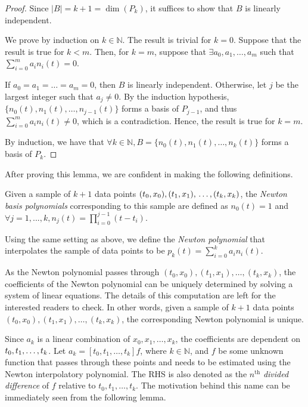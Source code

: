 \documentclass[a4paper,11pt,titlepage]{article}
\theoremstyle{definition}
\theoremstyle{plain}
\theoremstyle{remark}
\begin{document}
\begin{proof}
    Since $|B|=k+1=\dim(P_k)$, it suffices to show that $B$ is linearly independent.
    
    We prove by induction on $k\in\mathbb{N}$. The result is trivial for $k=0$. Suppose that the result is true for $k<m$. Then, for $k=m$, suppose that $\exists a_0,a_1,\dots,a_m$ such that $\sum_{i=0}^ma_in_i(t)=0$.

    If $a_0=a_1=\dots=a_m=0$, then $B$ is linearly independent. Otherwise, let $j$ be the largest integer such that $a_j\neq0$. By the induction hypothesis, $\{n_0(t),n_1(t),\dots,n_{j-1}(t)\}$ forms a basis of $P_{j-1}$, and thus $\sum_{i=0}^ma_in_i(t)\neq0$, which is a contradiction. Hence, the result is true for $k=m$.

    By induction, we have that $\forall k\in\mathbb{N}, B=\{n_0(t),n_1(t),\dots,n_k(t)\}$ forms a basis of $P_k$.
\end{proof}

After proving this lemma, we are confident in making the following definitions.

Given a sample of $k+1$ data points
$(t_0,x_0), (t_1,x_1), \\\dots, (t_k,x_k)$, the \textit{Newton basis polynomials} corresponding to this sample are defined as $n_0(t)=1$ and $\forall j=1,...,k, n_j(t)=\prod_{i=0}^{j-1}(t-t_i)$.

Using the same setting as above, we define the \textit{Newton polynomial} that interpolates the sample of data points to be $p_k(t)=\sum_{i=0}^ka_in_i(t)$.

As the Newton polynomial passes through $(t_0,x_0), (t_1,x_1), \dots, (t_k,x_k)$, the coefficients of the Newton polynomial can be uniquely determined by solving a system of linear equations. The details of this computation are left for the interested readers to check. In other words, given a sample of $k+1$ data points
$(t_0,x_0), (t_1,x_1), \dots, (t_k,x_k)$, the corresponding Newton polynomial is unique.

Since $a_k$ is a linear combination of $x_0,x_1,\dots,x_k$, the coefficients are dependent on $t_0,t_1,\dots,\\t_k$. Let $a_k=[t_0,t_1,\dots,t_k]f$, where $k\in\mathbb{N}$, and $f$ be some unknown function that passes through these points and needs to be estimated using the Newton interpolatory polynomial. The RHS is also denoted as the $n^{\mathrm{th}}$ \textit{divided difference} of $f$ relative to $t_0,t_1,\dots,t_k$. The motivation behind this name can be immediately seen from the following lemma.
\end{document}
